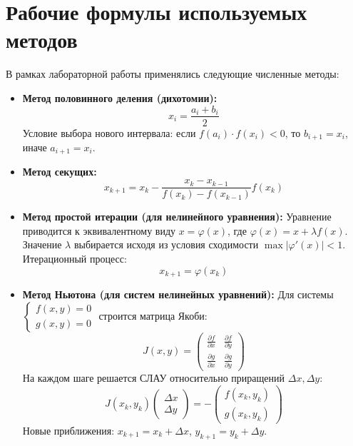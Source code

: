 \documentclass[a4paper,12pt]{article}
\begin{document}
\section{Рабочие формулы используемых методов}
В рамках лабораторной работы применялись следующие численные методы:
\begin{itemize}
    \item \textbf{Метод половинного деления (дихотомии):}
    \begin{equation}
        x_i = \frac{a_i + b_i}{2}
    \end{equation}
    Условие выбора нового интервала: если $f(a_i) \cdot f(x_i) < 0$, то $b_{i+1} = x_i$, иначе $a_{i+1} = x_i$.

    \item \textbf{Метод секущих:}
    \begin{equation}
        x_{k+1} = x_k - \frac{x_k - x_{k-1}}{f(x_k) - f(x_{k-1})} f(x_k)
    \end{equation}

    \item \textbf{Метод простой итерации (для нелинейного уравнения):}
    Уравнение приводится к эквивалентному виду $x = \varphi(x)$, где $\varphi(x) = x + \lambda f(x)$. Значение $\lambda$ выбирается исходя из условия сходимости $\max |\varphi'(x)| < 1$. Итерационный процесс:
    \begin{equation}
        x_{k+1} = \varphi(x_k)
    \end{equation}

    \item \textbf{Метод Ньютона (для систем нелинейных уравнений):}
    Для системы $\begin{cases} f(x, y) = 0 \\ g(x, y) = 0 \end{cases}$ строится матрица Якоби:
    \begin{equation}
        J(x, y) = \begin{pmatrix} \frac{\partial f}{\partial x} & \frac{\partial f}{\partial y} \\ \frac{\partial g}{\partial x} & \frac{\partial g}{\partial y} \end{pmatrix}
    \end{equation}
    На каждом шаге решается СЛАУ относительно приращений $\Delta x, \Delta y$:
    \begin{equation}
        J(x_k, y_k) \begin{pmatrix} \Delta x \\ \Delta y \end{pmatrix} = -\begin{pmatrix} f(x_k, y_k) \\ g(x_k, y_k) \end{pmatrix}
    \end{equation}
    Новые приближения: $x_{k+1} = x_k + \Delta x$, $y_{k+1} = y_k + \Delta y$.
\end{itemize}
\end{document}
